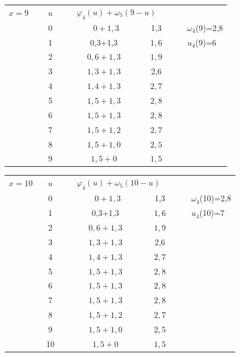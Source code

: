 \begin{flushleft}
\begin{tabular}[c]{c|c|c|c|c  }
\cline{2-4}
$x=9\mspace{10mu}$&$\mspace{15mu}u\mspace{15mu}$&\multicolumn{2}{|c|}{$\mspace{20mu}\varphi_4(u)+\omega_5(9-u)\mspace{18mu}$}& \\[0.07cm]
\cline{2-4}
 &0&$\mspace{40mu}0+1,3\mspace{30mu}$&1,3&$\mspace{32mu}\omega_4$(9)=2,8\\[0.07cm]
\cline{2-4}
 &1&0,3+1,3&$1,6$&$\mspace{18mu}u_4$(9)=6\\[0.07cm]
\cline{2-4}
 &2&$0,6+1,3$&$1,9$\\[0.07cm]
\cline{2-4}
 &3&$1,3+1,3$&2,6\\[0.07cm]
\cline{2-4}
 &4&$1,4+1,3$&$2,7$\\[0.07cm]
\cline{2-4}
 &5&$1,5+1,3$&$2,8$\\[0.07cm]
\cline{2-4}
 &6&$1,5+1,3$&$\boxed{2,8}$\\[0.07cm]
\cline{2-4}
 &7&$1,5+1,2$&$2,7$\\[0.07cm]
\cline{2-4}
 &8&$1,5+1,0$&$2,5$\\[0.07cm]
\cline{2-4}
 &9&$1,5+0$&$1,5$\\[0.07cm]
\cline{2-4}
\end{tabular}
\end{flushleft}


\begin{flushleft}
\begin{tabular}[c]{c|c|c|c|c  }
\cline{2-4}
$x=10\mspace{1mu}$&$\mspace{15mu}u\mspace{15mu}$&\multicolumn{2}{|c|}{$\mspace{20mu}\varphi_4(u)+\omega_5(10-u)\mspace{18mu}$}& \\[0.07cm]
\cline{2-4}
 &0&$\mspace{40mu}0+1,3\mspace{30mu}$&1,3&$\mspace{32mu}\omega_4$(10)=2,8\\[0.07cm]
\cline{2-4}
 &1&0,3+1,3&$1,6$&$\mspace{18mu}u_4$(10)=7\\[0.07cm]
\cline{2-4}
 &2&$0,6+1,3$&$1,9$\\[0.07cm]
\cline{2-4}
 &3&$1,3+1,3$&2,6\\[0.07cm]
\cline{2-4}
 &4&$1,4+1,3$&$2,7$\\[0.07cm]
\cline{2-4}
 &5&$1,5+1,3$&$2,8$\\[0.07cm]
\cline{2-4}
 &6&$1,5+1,3$&$2,8$\\[0.07cm]
\cline{2-4}
 &7&$1,5+1,3$&$\boxed{2,8}$\\[0.07cm]
\cline{2-4}
 &8&$1,5+1,2$&$2,7$\\[0.07cm]
\cline{2-4}
 &9&$1,5+1,0$&$2,5$\\[0.07cm]
\cline{2-4}
 &10&$1,5+0$&$1,5$\\[0.07cm]
\cline{2-4}
\end{tabular}
\end{flushleft}


